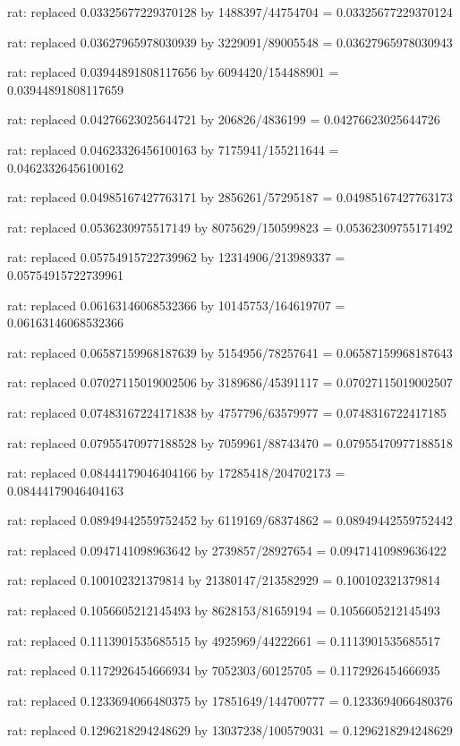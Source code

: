 \documentclass[a4paper,10pt]{article}
\begin{document}
\begin{eulernotebook}
\begin{eulercomment}
\begin{eulercomment}
\begin{eulercomment}
\begin{eulercomment}
\begin{eulercomment}
\begin{eulercomment}
\begin{eulercomment}
\begin{eulercomment}
\begin{eulercomment}
\begin{eulercomment}
\begin{eulercomment}
\begin{eulercomment}
\begin{eulercomment}
\begin{eulercomment}
\begin{eulercomment}
\begin{eulercomment}
\begin{euleroutput}
  rat: replaced 0.03325677229370128 by 1488397/44754704 = 0.03325677229370124
  
  rat: replaced 0.03627965978030939 by 3229091/89005548 = 0.03627965978030943
  
  rat: replaced 0.03944891808117656 by 6094420/154488901 = 0.03944891808117659
  
  rat: replaced 0.04276623025644721 by 206826/4836199 = 0.04276623025644726
  
  rat: replaced 0.04623326456100163 by 7175941/155211644 = 0.04623326456100162
  
  rat: replaced 0.04985167427763171 by 2856261/57295187 = 0.04985167427763173
  
  rat: replaced 0.0536230975517149 by 8075629/150599823 = 0.05362309755171492
  
  rat: replaced 0.05754915722739962 by 12314906/213989337 = 0.05754915722739961
  
  rat: replaced 0.06163146068532366 by 10145753/164619707 = 0.06163146068532366
  
  rat: replaced 0.06587159968187639 by 5154956/78257641 = 0.06587159968187643
  
  rat: replaced 0.07027115019002506 by 3189686/45391117 = 0.07027115019002507
  
  rat: replaced 0.07483167224171838 by 4757796/63579977 = 0.0748316722417185
  
  rat: replaced 0.07955470977188528 by 7059961/88743470 = 0.07955470977188518
  
  rat: replaced 0.08444179046404166 by 17285418/204702173 = 0.08444179046404163
  
  rat: replaced 0.08949442559752452 by 6119169/68374862 = 0.08949442559752442
  
  rat: replaced 0.0947141098963642 by 2739857/28927654 = 0.09471410989636422
  
  rat: replaced 0.100102321379814 by 21380147/213582929 = 0.100102321379814
  
  rat: replaced 0.1056605212145493 by 8628153/81659194 = 0.1056605212145493
  
  rat: replaced 0.1113901535685515 by 4925969/44222661 = 0.1113901535685517
  
  rat: replaced 0.1172926454666934 by 7052303/60125705 = 0.1172926454666935
  
  rat: replaced 0.1233694066480375 by 17851649/144700777 = 0.1233694066480376
  
  rat: replaced 0.1296218294248629 by 13037238/100579031 = 0.1296218294248629
  

\end{euleroutput}
\end{eulercomment}
\end{eulercomment}
\end{eulercomment}
\end{eulercomment}
\end{eulercomment}
\end{eulercomment}
\end{eulercomment}
\end{eulercomment}
\end{eulercomment}
\end{eulercomment}
\end{eulercomment}
\end{eulercomment}
\end{eulercomment}
\end{eulercomment}
\end{eulercomment}
\end{eulercomment}
\end{eulernotebook}
\end{document}
